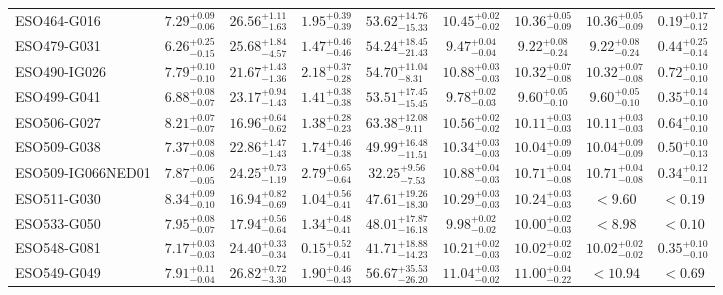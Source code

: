 \documentclass[onecolumn]{mn2e}
\begin{document}
{\begin{center}
\begin{longtable}{lcccccccc}
ESO464-G016 & $7.29_{-0.06}^{+0.09}$ & $26.56_{-1.63}^{+1.11}$ & $1.95_{-0.39}^{+0.39}$ &$53.62_{-15.33}^{+14.76}$ & $10.45_{-0.02}^{+0.02}$ & $10.36_{-0.09}^{+0.05}$ & $10.36_{-0.09}^{+0.05}$ & $0.19_{-0.12}^{+0.17}$ \\
ESO479-G031 & $6.26_{-0.15}^{+0.25}$ & $25.68_{-4.57}^{+1.84}$ & $1.47_{-0.46}^{+0.46}$ &$54.24_{-21.43}^{+18.45}$ & $9.47_{-0.04}^{+0.04}$ & $9.22_{-0.24}^{+0.08}$ & $9.22_{-0.24}^{+0.08}$ & $0.44_{-0.14}^{+0.25}$ \\
ESO490-IG026 & $7.79_{-0.10}^{+0.10}$ & $21.67_{-1.36}^{+1.43}$ & $2.18_{-0.28}^{+0.37}$ &$54.70_{-8.31}^{+11.04}$ & $10.88_{-0.03}^{+0.03}$ & $10.32_{-0.08}^{+0.07}$ & $10.32_{-0.08}^{+0.07}$ & $0.72_{-0.10}^{+0.10}$ \\
ESO499-G041 & $6.88_{-0.07}^{+0.08}$ & $23.17_{-1.43}^{+0.94}$ & $1.41_{-0.38}^{+0.38}$ &$53.51_{-15.45}^{+17.45}$ & $9.78_{-0.03}^{+0.02}$ & $9.60_{-0.10}^{+0.05}$ & $9.60_{-0.10}^{+0.05}$ & $0.35_{-0.10}^{+0.14}$ \\
ESO506-G027 & $8.21_{-0.07}^{+0.07}$ & $16.96_{-0.62}^{+0.64}$ & $1.38_{-0.23}^{+0.28}$ &$63.38_{-9.11}^{+12.08}$ & $10.56_{-0.02}^{+0.02}$ & $10.11_{-0.03}^{+0.03}$ & $10.11_{-0.03}^{+0.03}$ & $0.64_{-0.10}^{+0.10}$ \\
ESO509-G038 & $7.37_{-0.08}^{+0.08}$ & $22.86_{-1.43}^{+1.47}$ & $1.74_{-0.38}^{+0.46}$ &$49.99_{-11.51}^{+16.48}$ & $10.34_{-0.03}^{+0.03}$ & $10.04_{-0.09}^{+0.09}$ & $10.04_{-0.09}^{+0.09}$ & $0.50_{-0.13}^{+0.10}$ \\
ESO509-IG066NED01 & $7.87_{-0.05}^{+0.06}$ & $24.25_{-1.19}^{+0.73}$ & $2.79_{-0.64}^{+0.65}$ &$32.25_{-7.53}^{+9.56}$ & $10.88_{-0.03}^{+0.04}$ & $10.71_{-0.08}^{+0.04}$ & $10.71_{-0.08}^{+0.04}$ & $0.34_{-0.11}^{+0.12}$ \\
ESO511-G030 & $8.34_{-0.10}^{+0.09}$ & $16.94_{-0.69}^{+0.82}$ & $1.04_{-0.41}^{+0.56}$ &$47.61_{-18.30}^{+19.26}$ & $10.29_{-0.03}^{+0.03}$ & $10.24_{-0.03}^{+0.03}$ & $<9.60$ & $<0.19$ \\
ESO533-G050 & $7.95_{-0.07}^{+0.08}$ & $17.94_{-0.64}^{+0.56}$ & $1.34_{-0.41}^{+0.48}$ &$48.01_{-16.18}^{+17.87}$ & $9.98_{-0.02}^{+0.02}$ & $10.00_{-0.03}^{+0.02}$ & $<8.98$ & $<0.10$ \\
ESO548-G081 & $7.17_{-0.03}^{+0.03}$ & $24.40_{-0.34}^{+0.33}$ & $0.15_{-0.41}^{+0.52}$ &$41.71_{-14.23}^{+18.88}$ & $10.21_{-0.03}^{+0.02}$ & $10.02_{-0.02}^{+0.02}$ & $10.02_{-0.02}^{+0.02}$ & $0.35_{-0.10}^{+0.10}$ \\
ESO549-G049 & $7.91_{-0.04}^{+0.11}$ & $26.82_{-3.30}^{+0.72}$ & $1.90_{-0.43}^{+0.46}$ &$56.67_{-26.20}^{+35.53}$ & $11.04_{-0.02}^{+0.03}$ & $11.00_{-0.22}^{+0.04}$ & $<10.94$ & $<0.69$ \\

\end{longtable}
\end{center}}
\end{document}
